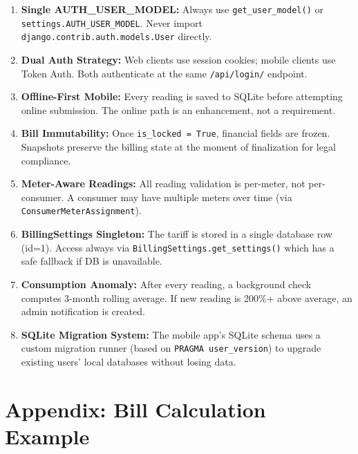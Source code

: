 \documentclass[12pt, a4paper]{report}
\begin{document}
\begin{enumerate}[leftmargin=1.8em, itemsep=6pt]
    \item \textbf{Single AUTH\_USER\_MODEL:} Always use \texttt{get\_user\_model()} or \texttt{settings.AUTH\_USER\_MODEL}. Never import \texttt{django.contrib.auth.models.User} directly.
    
    \item \textbf{Dual Auth Strategy:} Web clients use session cookies; mobile clients use Token Auth. Both authenticate at the same \texttt{/api/login/} endpoint.
    
    \item \textbf{Offline-First Mobile:} Every reading is saved to SQLite before attempting online submission. The online path is an enhancement, not a requirement.
    
    \item \textbf{Bill Immutability:} Once \texttt{is\_locked = True}, financial fields are frozen. Snapshots preserve the billing state at the moment of finalization for legal compliance.
    
    \item \textbf{Meter-Aware Readings:} All reading validation is per-meter, not per-consumer. A consumer may have multiple meters over time (via \texttt{ConsumerMeterAssignment}).
    
    \item \textbf{BillingSettings Singleton:} The tariff is stored in a single database row (id=1). Access always via \texttt{BillingSettings.get\_settings()} which has a safe fallback if DB is unavailable.
    
    \item \textbf{Consumption Anomaly:} After every reading, a background check computes 3-month rolling average. If new reading is 200\%+ above average, an admin notification is created.
    
    \item \textbf{SQLite Migration System:} The mobile app's SQLite schema uses a custom migration runner (based on \texttt{PRAGMA user\_version}) to upgrade existing users' local databases without losing data.
\end{enumerate}

\chapter*{Appendix: Bill Calculation Example}
\end{document}
